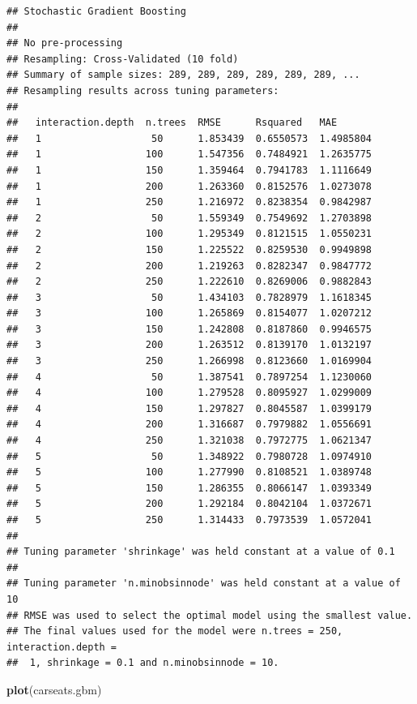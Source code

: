\documentclass[
]{book}
\newenvironment{Shaded}{\begin{snugshade}}{\end{snugshade}}
\newcommand{\KeywordTok}[1]{\textcolor[rgb]{0.13,0.29,0.53}{\textbf{#1}}}
\newcommand{\NormalTok}[1]{#1}
\begin{document}
\begin{verbatim}
## Stochastic Gradient Boosting 
## 
## No pre-processing
## Resampling: Cross-Validated (10 fold) 
## Summary of sample sizes: 289, 289, 289, 289, 289, 289, ... 
## Resampling results across tuning parameters:
## 
##   interaction.depth  n.trees  RMSE      Rsquared   MAE      
##   1                   50      1.853439  0.6550573  1.4985804
##   1                  100      1.547356  0.7484921  1.2635775
##   1                  150      1.359464  0.7941783  1.1116649
##   1                  200      1.263360  0.8152576  1.0273078
##   1                  250      1.216972  0.8238354  0.9842987
##   2                   50      1.559349  0.7549692  1.2703898
##   2                  100      1.295349  0.8121515  1.0550231
##   2                  150      1.225522  0.8259530  0.9949898
##   2                  200      1.219263  0.8282347  0.9847772
##   2                  250      1.222610  0.8269006  0.9882843
##   3                   50      1.434103  0.7828979  1.1618345
##   3                  100      1.265869  0.8154077  1.0207212
##   3                  150      1.242808  0.8187860  0.9946575
##   3                  200      1.263512  0.8139170  1.0132197
##   3                  250      1.266998  0.8123660  1.0169904
##   4                   50      1.387541  0.7897254  1.1230060
##   4                  100      1.279528  0.8095927  1.0299009
##   4                  150      1.297827  0.8045587  1.0399179
##   4                  200      1.316687  0.7979882  1.0556691
##   4                  250      1.321038  0.7972775  1.0621347
##   5                   50      1.348922  0.7980728  1.0974910
##   5                  100      1.277990  0.8108521  1.0389748
##   5                  150      1.286355  0.8066147  1.0393349
##   5                  200      1.292184  0.8042104  1.0372671
##   5                  250      1.314433  0.7973539  1.0572041
## 
## Tuning parameter 'shrinkage' was held constant at a value of 0.1
## 
## Tuning parameter 'n.minobsinnode' was held constant at a value of 10
## RMSE was used to select the optimal model using the smallest value.
## The final values used for the model were n.trees = 250, interaction.depth =
##  1, shrinkage = 0.1 and n.minobsinnode = 10.
\end{verbatim}

\begin{Shaded}
\begin{Highlighting}[]
\KeywordTok{plot}\NormalTok{(carseats.gbm)}
\end{Highlighting}
\end{Shaded}
\end{document}
